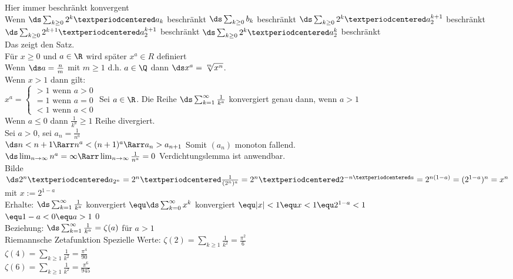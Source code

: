 Hier immer beschränkt \equ konvergent\\
Wenn $\ds \sum_{k \geq 0} 2^k · a_k$ beschränkt \Rarr $\ds \sum_{k \geq 0} b_k$ beschränkt \Rarr $\ds \sum_{k \geq 0} 2^{k} · a_2^{k+1}$ beschränkt \equ $\ds \sum_{k \geq 0} 2^{k+1} · a_2^{k+1}$ beschränkt \equ $\ds \sum_{k \geq 0} 2^{k} · a_2^{k}$ beschränkt\\
Das zeigt den Satz.\\
    Für $ x\geq 0$ und $a \in \R$ wird später $x^a \in R$ definiert\\
    Wenn $\ds a = \frac{n}{m}$ mit $m \geq 1$ d.h. $a \in \Q$ dann $\ds x^a = \sqrt[m]{x^n}$.\\
    Wenn $x > 1$ dann gilt: \\
    $x^a = \begin{cases} >1 \mbox{ wenn }a>0\\ =1 \mbox{ wenn }a=0\\ <1\mbox{ wenn }a<0 \end{cases}$
%
Sei $a \in \R$. Die Reihe $\ds \sum_{k=1}^{\infty} \frac{1}{k^a}$ konvergiert genau dann, wenn $a > 1$\\
\bew
Wenn $a \leq 0$ dann $\frac{1}{k^a} \geq 1$ \Rarr Reihe divergiert.\\
Sei $a >0$, sei $a_n = \frac{1}{n^a}$ \\
$\ds n < n+1 \Rarr n^a < (n+1)^a \Rarr a_n > a_{n+1}$ Somit $(a_n)$ monoton fallend.\\
$\ds \lim_{n\to \infty} n^a = \infty \Rarr \lim_{n \to \infty} \frac{1}{n^a} = 0$ \Rarr Verdichtungslemma ist anwendbar.\\
Bilde $\ds 2^n · a_{2^n} = 2^n · \frac{1}{(2^n)^a} = 2^n · 2^{-n · a} = 2^{n(1-a)} = (2^{1-a})^n = x^n$\\
mit $x:=2^{1-a}$\\
Erhalte:
$\ds \sum_{k=1}^\infty \frac{1}{k^a}$ konvergiert $\equ \ds \sum_{k=0}^\infty x^k$ konvergiert $\equ |x|<1 \equ x<1 \equ 2^{1-a} <1$\\
$\equ 1-a<0 \equ a>1$\qed\\[4pt]
Beziehung:
$\ds \sum_{k=1}^\infty\frac{1}{k^a}=\zeta (a)$ für $a>1$\\
Riemannsche Zetafunktion
Spezielle Werte:
$\zeta (2) = \sum_{k\geq1}\frac{1}{k^2}=\frac{\pi^2}{6}$\\
$\zeta (4) = \sum_{k\geq1}\frac{1}{k^2}=\frac{\pi^4}{90}$\\
$\zeta (6) = \sum_{k\geq1}\frac{1}{k^2}=\frac{\pi^6}{945}$\\
